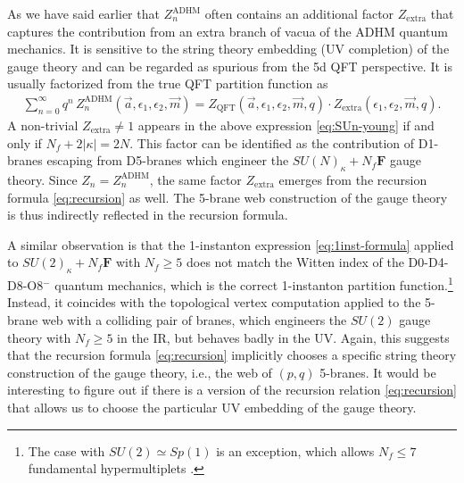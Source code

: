 \documentclass[letterpaper, 11pt]{article}
\def\e{\epsilon}
\begin{document}
{As we have said earlier that $Z_n^\text{ADHM}$ often contains an additional factor $Z_\text{extra}$ that captures the contribution from an extra branch of vacua of the ADHM quantum mechanics. It is sensitive to the string theory embedding (UV completion) of the gauge theory and can be regarded as spurious from the 5d QFT perspective. It is usually factorized from the true QFT partition function as 
\begin{align}
  \sum_{n=0}^\infty q^n \,Z_n^\text{ADHM}(\vec{a}, \e_{1},\e_2, \vec{m}) = Z_\text{QFT}(\vec{a}, \e_{1},\e_2, \vec{m},q) \cdot Z_\text{extra}(\e_{1},\e_2,  \vec{m},q).
\end{align}
A non-trivial $Z_\text{extra}\neq 1$ appears in the above expression \eqref{eq:SUn-young} if and only if $N_f + 2|\kappa| = 2N$. This factor can be identified as the contribution of D1-branes escaping from D5-branes which engineer the $SU(N)_\kappa + N_f\mathbf{F}$ gauge theory. Since $Z_n = Z_n^\text{ADHM}$, the same factor $Z_\text{extra}$ emerges from the recursion formula \eqref{eq:recursion} as well. The 5-brane web construction of the gauge theory is thus indirectly reflected in the recursion formula. 

A similar observation is that the 1-instanton expression \eqref{eq:1inst-formula} applied to $SU(2)_\kappa+N_f\mathbf{F}$ with $N_f \geq 5$ does not match the Witten index of the D0-D4-D8-O8${}^-$  quantum mechanics, which is the correct 1-instanton partition function.\footnote{The case with $SU(2) \simeq Sp(1
)$ is an exception, which allows $N_f \leq 7$ fundamental hypermultiplets \cite{Seiberg:1996bd}.} Instead, it coincides with the topological vertex computation applied to the 5-brane web with a colliding pair of branes, which engineers the $SU(2)$ gauge theory with $N_f \geq 5$ in the IR, but behaves badly in the UV. Again, this suggests that the recursion formula \eqref{eq:recursion} implicitly chooses a specific string theory construction of the gauge theory, i.e., the web of $(p,q)$ 5-branes. It would be interesting to figure out if there is a version of the recursion relation \eqref{eq:recursion} that allows us to choose the particular UV embedding of the gauge theory. 


}
\end{document}
